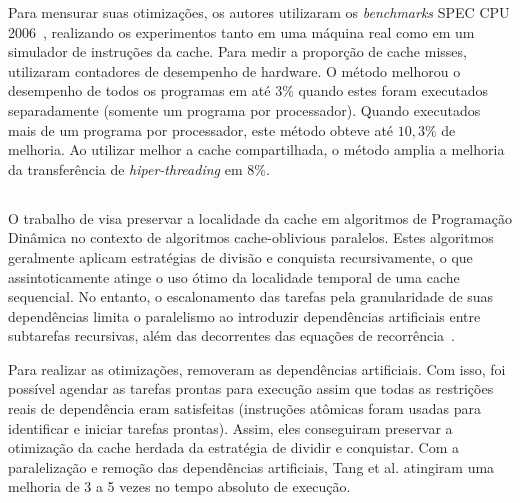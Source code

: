Para mensurar suas otimizações, os autores utilizaram os \textit{benchmarks} SPEC CPU 2006~\cite{spec2006}, realizando os experimentos tanto em uma máquina real como em um simulador de instruções da cache. Para medir a proporção de cache misses, utilizaram contadores de desempenho de hardware.
O método melhorou o desempenho de todos os programas em até $3\%$ quando estes foram executados separadamente (somente um programa por processador).
Quando executados mais de um programa por processador, este método obteve até $10,3\%$ de melhoria. Ao utilizar melhor a cache compartilhada, o método amplia a melhoria da transferência de \textit{hiper-threading} em $8\%$.

\subsection{}

O trabalho de  visa preservar a localidade da cache em algoritmos de Programação Dinâmica no contexto de algoritmos cache-oblivious paralelos.
Estes algoritmos geralmente aplicam estratégias de divisão e conquista recursivamente, o que assintoticamente atinge o uso ótimo da localidade temporal de uma cache sequencial.
No entanto, o escalonamento das tarefas pela granularidade de suas dependências limita o paralelismo ao introduzir dependências artificiais entre subtarefas recursivas, além das decorrentes das equações de recorrência~\cite{Tang2015}.

Para realizar as otimizações,  removeram as dependências artificiais. Com isso, foi possível agendar as tarefas prontas para execução assim que todas as restrições reais de dependência eram satisfeitas (instruções atômicas foram usadas para identificar e iniciar tarefas prontas). Assim, eles conseguiram preservar a otimização da cache herdada da estratégia de dividir e conquistar.
Com a paralelização e remoção das dependências artificiais, Tang et al. atingiram uma melhoria de 3 a 5 vezes no tempo absoluto de execução.

\subsection{}


